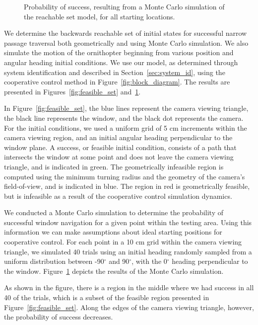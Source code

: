\documentclass{aamas2013}
\begin{document}
\begin{figure}[tb]
\begin{minipage}[t]{0.47\linewidth}
\caption{Probability of success, resulting from a Monte Carlo simulation of
the reachable set model, for all starting locations.}
\label{fig:heat_map}
\end{minipage}
\end{figure}

We determine the backwards reachable set of initial states for successful
narrow passage traversal both geometrically and using Monte Carlo simulation.
We also simulate the motion of the ornithopter beginning from various position
and angular heading initial conditions. We use our model, as determined
through system identification and described in Section~\ref{sec:system_id},
using the cooperative control method in Figure~\ref{fig:block_diagram}. The
results are presented in Figures~\ref{fig:feasible_set}
and~\ref{fig:heat_map}.

In Figure~\ref{fig:feasible_set}, 
the blue lines represent the camera viewing triangle, the black line represents the window, and the black 
dot represents the camera. For the initial conditions, we used a uniform
grid of 5 cm increments within the camera viewing region, and an initial
angular heading perpendicular to the window plane. A success, or feasible 
initial condition, consists of a path that intersects the window at some 
point and does not leave the camera viewing triangle, and is indicated in 
green. The geometrically infeasible region is computed using the minimum 
turning radius and the geometry of the camera's field-of-view, and is 
indicated in blue. The region in red is geometrically feasible, but is 
infeasible as a result of the cooperative control simulation dynamics.

We conducted a Monte Carlo simulation to determine the probability of
successful window navigation for a given point within the testing area. Using
this information we can make assumptions about ideal starting positions for
cooperative control. For each point in a 10 cm grid within the camera
viewing triangle, we simulated 40 trials using an initial heading randomly
sampled from a uniform distribution between -90$^{\circ}$ and 90$^{\circ}$,
with the 0$^{\circ}$ heading perpendicular to the window.
Figure~\ref{fig:heat_map} depicts the results of the Monte Carlo simulation.

As shown in the figure, there is a region in the middle where we had success
in all 40 of the trials, which is a subset of the feasible region presented in
Figure~\ref{fig:feasible_set}. Along the edges of the camera viewing triangle,
however, the probability of success decreases.
\end{document}
